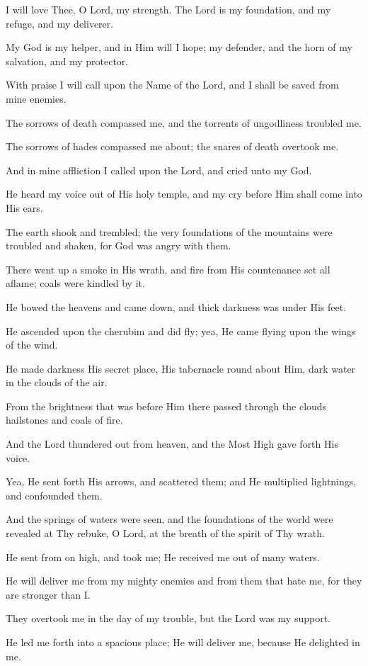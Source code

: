 I will love Thee, O Lord, my strength. The Lord is my foundation, and my refuge, and my deliverer.

My God is my helper, and in Him will I hope; my defender, and the horn of my salvation, and my protector.

With praise I will call upon the Name of the Lord, and I shall be saved from mine enemies.

The sorrows of death compassed me, and the torrents of ungodliness troubled me.

The sorrows of hades compassed me about; the snares of death overtook me.

And in mine affliction I called upon the Lord, and cried unto my God.

He heard my voice out of His holy temple, and my cry before Him shall come into His ears.

The earth shook and trembled; the very foundations of the mountains were troubled and shaken, for God was angry with them.

There went up a smoke in His wrath, and fire from His countenance set all aflame; coals were kindled by it.

He bowed the heavens and came down, and thick darkness was under His feet.

He ascended upon the cherubim and did fly; yea, He came flying upon the wings of the wind.

He made darkness His secret place, His tabernacle round about Him, dark water in the clouds of the air.

From the brightness that was before Him there passed through the clouds hailstones and coals of fire.

And the Lord thundered out from heaven, and the Most High gave forth His voice.

Yea, He sent forth His arrows, and scattered them; and He multiplied lightnings, and confounded them.

And the springs of waters were seen, and the foundations of the world were revealed at Thy rebuke, O Lord, at the breath of the spirit of Thy wrath.

He sent from on high, and took me; He received me out of many waters.

He will deliver me from my mighty enemies and from them that hate me, for they are stronger than I.

They overtook me in the day of my trouble, but the Lord was my support.

He led me forth into a spacious place; He will deliver me, because He delighted in me.

